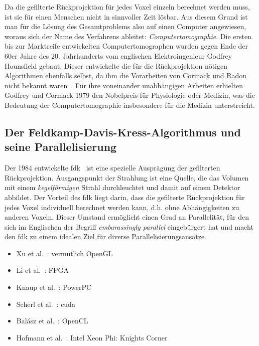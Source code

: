 Da die gefilterte Rückprojektion für jedes Voxel einzeln berechnet werden muss, ist sie für einen Menschen nicht in
sinnvoller Zeit lösbar. Aus diesem Grund ist man für die Lösung des Gesamtproblems also auf einen Computer angewiesen,
woraus sich der Name des Verfahrens ableitet: \textit{Computertomographie}. Die ersten bis zur Marktreife entwickelten
Computertomographen wurden gegen Ende der 60er Jahre des 20. Jahrhunderts vom englischen Elektroingenieur Godfrey
Hounsfield gebaut. Dieser entwickelte die für die Rückprojektion nötigen Algorithmen ebenfalls selbst, da ihm die
Vorarbeiten von Cormack und Radon nicht bekannt waren~\cite{kalender}. Für ihre voneinander unabhängigen Arbeiten
erhielten Godfrey und Cormack 1979 den Nobelpreis für Physiologie oder Medizin, was die Bedeutung der
Computertomographie insbesondere für die Medizin unterstreicht.

\subsection{Der Feldkamp-Davis-Kress-Algorithmus und seine Parallelisierung}

Der 1984 entwickelte \gls{fdk}~\cite{fdk} ist eine spezielle Ausprägung der gefilterten Rückprojektion. Ausgangspunkt
der Strahlung ist eine Quelle, die das Volumen mit einem \textit{kegelförmigen} Strahl durchleuchtet und damit auf einem
Detektor abbildet. Der Vorteil des \gls{fdk} liegt darin, dass die gefilterte Rückprojektion für jedes Voxel individuell
berechnet werden kann, d.h. ohne Abhängigkeiten zu anderen Voxeln. Dieser Umstand ermöglicht einen Grad an Parallelität,
für den sich im Englischen der Begriff \textit{embarassingly parallel} eingebürgert hat und macht den \gls{fdk} zu einem
idealen Ziel für diverse Parallelisierungsansätze.

\begin{itemize}
    \item Xu et al.~\cite{xumuell}: vermutlich OpenGL
    \item Li et al.~\cite{lipapa}: FPGA
    \item Knaup et al.~\cite{knaupsteck}: PowerPC
    \item Scherl et al.~\cite{scherlkeck}: \gls{cuda}
    \item Balász et al.~\cite{balgab}: OpenCL
    \item Hofmann et al.~\cite{hoftrei}: Intel{\textregistered} Xeon Phi{\texttrademark}: Knights Corner
\end{itemize}


